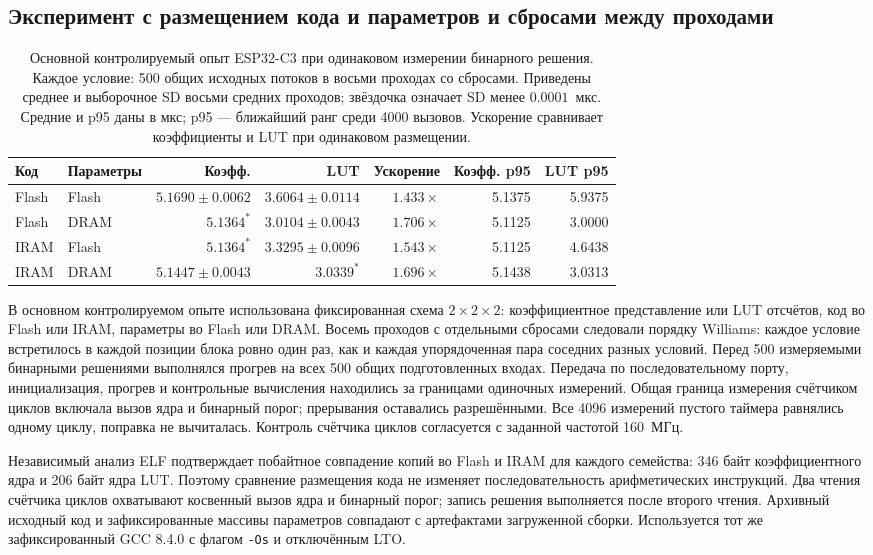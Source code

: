 \subsection{Эксперимент с размещением кода и параметров и сбросами между проходами}
\label{sec:c3followup}
\begin{table}[htbp]
\centering\footnotesize\setlength{\tabcolsep}{4pt}
\caption{Основной контролируемый опыт ESP32-C3 при одинаковом измерении бинарного решения. Каждое условие: 500 общих исходных потоков в восьми проходах со сбросами. Приведены среднее и выборочное SD восьми средних проходов; звёздочка означает SD менее $0.0001$~мкс. Средние и p95 даны в мкс; p95 --- ближайший ранг среди 4000 вызовов. Ускорение сравнивает коэффициенты и LUT при одинаковом размещении.}
\label{tab:c3_followup}
\begin{tabular}{llrrrrr}
\toprule
Код & Параметры & Коэфф. & LUT & Ускорение & Коэфф. p95 & LUT p95\\
\midrule
Flash & Flash & $5.1690\pm0.0062$ & $3.6064\pm0.0114$ & $1.433\times$ & 5.1375 & 5.9375\\
Flash & DRAM & $5.1364^{*}$ & $3.0104\pm0.0043$ & $1.706\times$ & 5.1125 & 3.0000\\
IRAM & Flash & $5.1364^{*}$ & $3.3295\pm0.0096$ & $1.543\times$ & 5.1125 & 4.6438\\
IRAM & DRAM & $5.1447\pm0.0043$ & $3.0339^{*}$ & $1.696\times$ & 5.1438 & 3.0313\\
\bottomrule
\end{tabular}
\end{table}

В основном контролируемом опыте использована фиксированная схема $2\times2\times2$: коэффициентное представление или LUT отсчётов, код во Flash или IRAM, параметры во Flash или DRAM. Восемь проходов с отдельными сбросами следовали порядку Williams: каждое условие встретилось в каждой позиции блока ровно один раз, как и каждая упорядоченная пара соседних разных условий. Перед 500 измеряемыми бинарными решениями выполнялся прогрев на всех 500 общих подготовленных входах. Передача по последовательному порту, инициализация, прогрев и контрольные вычисления находились за границами одиночных измерений. Общая граница измерения счётчиком циклов включала вызов ядра и бинарный порог; прерывания оставались разрешёнными. Все 4096 измерений пустого таймера равнялись одному циклу, поправка не вычиталась. Контроль счётчика циклов согласуется с заданной частотой 160~МГц.

Независимый анализ ELF подтверждает побайтное совпадение копий во Flash и IRAM для каждого семейства: 346 байт коэффициентного ядра и 206 байт ядра LUT. Поэтому сравнение размещения кода не изменяет последовательность арифметических инструкций. Два чтения счётчика циклов охватывают косвенный вызов ядра и бинарный порог; запись решения выполняется после второго чтения. Архивный исходный код и зафиксированные массивы параметров совпадают с артефактами загруженной сборки. Используется тот же зафиксированный GCC 8.4.0 с флагом \texttt{-Os} и отключённым LTO.

